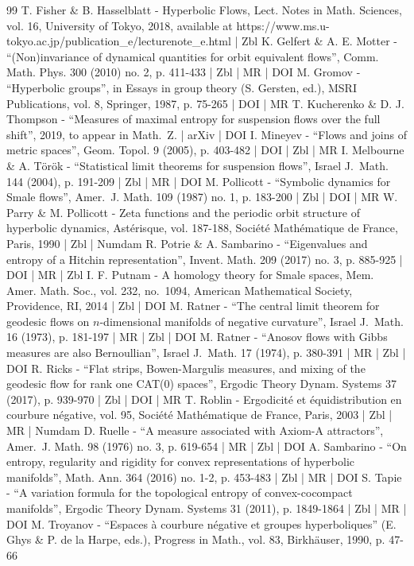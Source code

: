 \begin{thebibliography}{99}
T. Fisher \& B. Hasselblatt - Hyperbolic Flows, Lect. Notes in Math. Sciences, vol. 16, University of Tokyo, 2018, available at https://www.ms.u-tokyo.ac.jp/publication\_e/lecturenote\_e.html | Zbl
K. Gelfert \& A. E. Motter - “(Non)invariance of dynamical quantities for orbit equivalent flows”, Comm. Math. Phys. 300 (2010) no. 2, p. 411-433 | Zbl | MR | DOI
M. Gromov - “Hyperbolic groups”, in Essays in group theory (S. Gersten, ed.), MSRI Publications, vol. 8, Springer, 1987, p. 75-265 | DOI | MR
T. Kucherenko \& D. J. Thompson - “Measures of maximal entropy for suspension flows over the full shift”, 2019, to appear in Math. Z. | arXiv | DOI
I. Mineyev - “Flows and joins of metric spaces”, Geom. Topol. 9 (2005), p. 403-482 | DOI | Zbl | MR
I. Melbourne \& A. Török - “Statistical limit theorems for suspension flows”, Israel J. Math. 144 (2004), p. 191-209 | Zbl | MR | DOI
M. Pollicott - “Symbolic dynamics for Smale flows”, Amer. J. Math. 109 (1987) no. 1, p. 183-200 | Zbl | DOI | MR
W. Parry \& M. Pollicott - Zeta functions and the periodic orbit structure of hyperbolic dynamics, Astérisque, vol. 187-188, Société Mathématique de France, Paris, 1990 | Zbl | Numdam
R. Potrie \& A. Sambarino - “Eigenvalues and entropy of a Hitchin representation”, Invent. Math. 209 (2017) no. 3, p. 885-925 | DOI | MR | Zbl
I. F. Putnam - A homology theory for Smale spaces, Mem. Amer. Math. Soc., vol. 232, no. 1094, American Mathematical Society, Providence, RI, 2014 | Zbl | DOI
M. Ratner - “The central limit theorem for geodesic flows on $n$-dimensional manifolds of negative curvature”, Israel J. Math. 16 (1973), p. 181-197 | MR | Zbl | DOI
M. Ratner - “Anosov flows with Gibbs measures are also Bernoullian”, Israel J. Math. 17 (1974), p. 380-391 | MR | Zbl | DOI
R. Ricks - “Flat strips, Bowen-Margulis measures, and mixing of the geodesic flow for rank one CAT(0) spaces”, Ergodic Theory Dynam. Systems 37 (2017), p. 939-970 | Zbl | DOI | MR
T. Roblin - Ergodicité et équidistribution en courbure négative, vol. 95, Société Mathématique de France, Paris, 2003 | Zbl | MR | Numdam
D. Ruelle - “A measure associated with Axiom-A attractors”, Amer. J. Math. 98 (1976) no. 3, p. 619-654 | MR | Zbl | DOI
A. Sambarino - “On entropy, regularity and rigidity for convex representations of hyperbolic manifolds”, Math. Ann. 364 (2016) no. 1-2, p. 453-483 | Zbl | MR | DOI
S. Tapie - “A variation formula for the topological entropy of convex-cocompact manifolds”, Ergodic Theory Dynam. Systems 31 (2011), p. 1849-1864 | Zbl | MR | DOI
M. Troyanov - “Espaces à courbure négative et groupes hyperboliques” (E. Ghys \& P. de la Harpe, eds.), Progress in Math., vol. 83, Birkhäuser, 1990, p. 47-66
\end{thebibliography}
